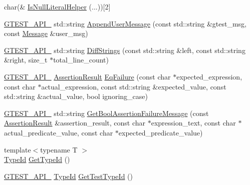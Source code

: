 \begin{DoxyCompactItemize}
\item 
char(\& \mbox{\hyperlink{namespacetesting_1_1internal_ab53ecfa1632a871ce7c692d722a75a57}{Is\+Null\+Literal\+Helper}} (...))\mbox{[}2\mbox{]}
\item 
\mbox{\hyperlink{gtest-port_8h_aa73be6f0ba4a7456180a94904ce17790}{G\+T\+E\+S\+T\+\_\+\+A\+P\+I\+\_\+}} std\+::string \mbox{\hyperlink{namespacetesting_1_1internal_af69e146a989e8d48def39a0cc59461c9}{Append\+User\+Message}} (const std\+::string \&gtest\+\_\+msg, const \mbox{\hyperlink{classtesting_1_1_message}{Message}} \&user\+\_\+msg)
\item 
\mbox{\hyperlink{gtest-port_8h_aa73be6f0ba4a7456180a94904ce17790}{G\+T\+E\+S\+T\+\_\+\+A\+P\+I\+\_\+}} std\+::string \mbox{\hyperlink{namespacetesting_1_1internal_a513107ff8defa97d949937fc1350a56c}{Diff\+Strings}} (const std\+::string \&left, const std\+::string \&right, size\+\_\+t $\ast$total\+\_\+line\+\_\+count)
\item 
\mbox{\hyperlink{gtest-port_8h_aa73be6f0ba4a7456180a94904ce17790}{G\+T\+E\+S\+T\+\_\+\+A\+P\+I\+\_\+}} \mbox{\hyperlink{classtesting_1_1_assertion_result}{Assertion\+Result}} \mbox{\hyperlink{namespacetesting_1_1internal_ac61e2ba2cbf259fd6ee5ffd4e49c9445}{Eq\+Failure}} (const char $\ast$expected\+\_\+expression, const char $\ast$actual\+\_\+expression, const std\+::string \&expected\+\_\+value, const std\+::string \&actual\+\_\+value, bool ignoring\+\_\+case)
\item 
\mbox{\hyperlink{gtest-port_8h_aa73be6f0ba4a7456180a94904ce17790}{G\+T\+E\+S\+T\+\_\+\+A\+P\+I\+\_\+}} std\+::string \mbox{\hyperlink{namespacetesting_1_1internal_aed8d3ad4341f8f2de53440e39c995632}{Get\+Bool\+Assertion\+Failure\+Message}} (const \mbox{\hyperlink{classtesting_1_1_assertion_result}{Assertion\+Result}} \&assertion\+\_\+result, const char $\ast$expression\+\_\+text, const char $\ast$actual\+\_\+predicate\+\_\+value, const char $\ast$expected\+\_\+predicate\+\_\+value)
\item 
{\footnotesize template$<$typename T $>$ }\\\mbox{\hyperlink{namespacetesting_1_1internal_ab1114197d3c657d8b7f8e0c5caa12d00}{Type\+Id}} \mbox{\hyperlink{namespacetesting_1_1internal_a6b108e56fdc68ea937ffb3759fb55ab0}{Get\+Type\+Id}} ()
\item 
\mbox{\hyperlink{gtest-port_8h_aa73be6f0ba4a7456180a94904ce17790}{G\+T\+E\+S\+T\+\_\+\+A\+P\+I\+\_\+}} \mbox{\hyperlink{namespacetesting_1_1internal_ab1114197d3c657d8b7f8e0c5caa12d00}{Type\+Id}} \mbox{\hyperlink{namespacetesting_1_1internal_a1e85cf16bb95b60f879d48ba1fbfc1c9}{Get\+Test\+Type\+Id}} ()

\end{DoxyCompactItemize}
